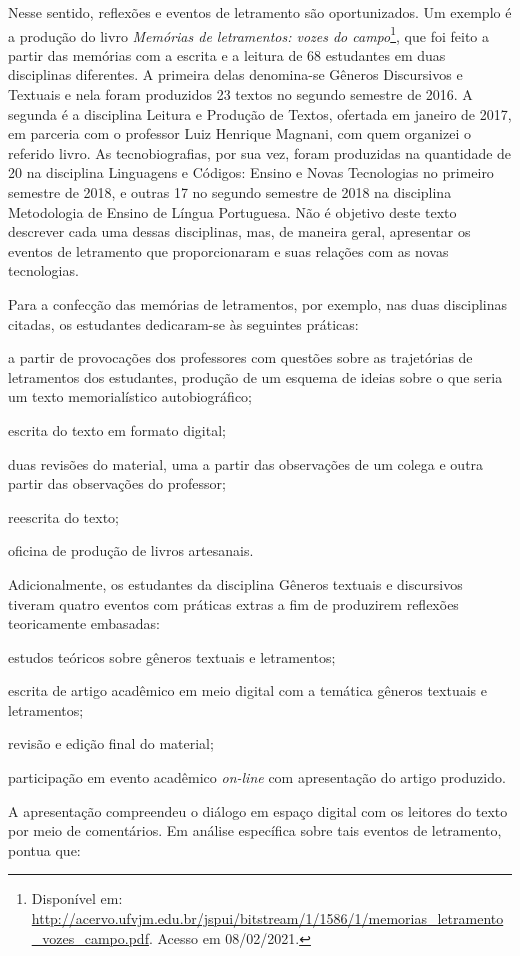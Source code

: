 \documentclass{textolivre}
\begin{document}
Nesse sentido, reflexões e eventos de letramento são oportunizados. Um exemplo é a produção do livro \textit{Memórias de letramentos: vozes do campo}\footnote{Disponível em: \url{http://acervo.ufvjm.edu.br/jspui/bitstream/1/1586/1/memorias_letramento_vozes_campo.pdf}. Acesso em 08/02/2021.}, que foi feito a partir das memórias com a escrita e a leitura de 68 estudantes em duas disciplinas diferentes. A primeira delas denomina-se Gêneros Discursivos e Textuais e nela foram produzidos 23 textos no segundo semestre de 2016. A segunda é a disciplina Leitura e Produção de Textos, ofertada em janeiro de 2017, em parceria com o professor Luiz Henrique Magnani, com quem organizei o referido livro. As tecnobiografias, por sua vez, foram produzidas na quantidade de 20 na disciplina Linguagens e Códigos: Ensino e Novas Tecnologias no primeiro semestre de 2018, e outras 17 no segundo semestre de 2018 na disciplina Metodologia de Ensino de Língua Portuguesa. Não é objetivo deste texto descrever cada uma dessas disciplinas, mas, de maneira geral, apresentar os eventos de letramento que proporcionaram e suas relações com as novas tecnologias.

Para a confecção das memórias de letramentos, por exemplo, nas duas disciplinas citadas, os estudantes dedicaram-se às seguintes práticas: 
\begin{enumerate*}[label=(\arabic*)] 
\item a partir de provocações dos professores com questões sobre as trajetórias de letramentos dos estudantes, produção de um esquema de ideias sobre o que seria um texto memorialístico autobiográfico; 
\item escrita do texto em formato digital; 
\item duas revisões do material, uma a partir das observações de um colega e outra partir das observações do professor; 
\item reescrita do texto; 
\item oficina de produção de livros artesanais. 
\end{enumerate*} 
Adicionalmente, os estudantes da disciplina Gêneros textuais e discursivos tiveram quatro eventos com práticas extras a fim de produzirem reflexões teoricamente embasadas: 
\begin{enumerate*}[label=(\arabic*)] 
\item estudos teóricos sobre gêneros textuais e letramentos; 
\item escrita de artigo acadêmico em meio digital com a temática gêneros textuais e letramentos; 
\item revisão e edição final do material; 
\item participação em evento acadêmico \textit{on-line} com apresentação do artigo produzido. 
\end{enumerate*} 
A apresentação compreendeu o diálogo em espaço digital com os leitores do texto por meio de comentários. Em análise específica sobre tais eventos de letramento, \textcite[p. 37-38]{castro_reflexao_2017} pontua que:
\end{document}
